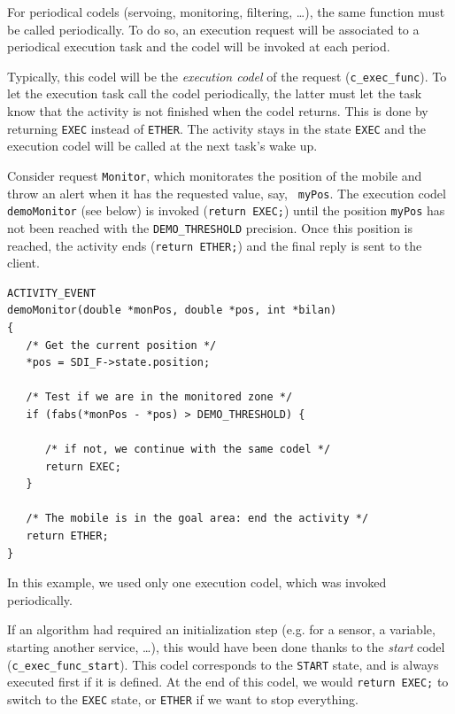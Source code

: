 For periodical codels (servoing, monitoring, filtering, \ldots), the same
function must be called periodically. To do so, an execution request will
be associated  to  a periodical  execution task  and  the  codel will  be
invoked at each period.

Typically, this codel  will be the {\em  execution codel} of the  request
({\tt  c\_exec\_func}).  To let   the    execution task call   the  codel
periodically, the latter must let the task know that  the activity is not
finished  when the codel  returns.  This is done  by returning {\tt EXEC}
instead  of {\tt ETHER}.  The activity stays  in the state {\tt EXEC} and
the execution codel will be called at the next task's wake up.

Consider request {\tt Monitor},   which monitorates the position   of the
mobile and  throw an  alert when it   has the requested value, say,  {\tt
myPos}.  The  execution codel  {\tt  demoMonitor} (see below)  is invoked
({\tt return EXEC;}) until the position {\tt myPos}  has not been reached
with the {\tt DEMO\_THRESHOLD} precision. Once  this position is reached,
the activity ends ({\tt return  ETHER;}) and the  final reply is sent  to
the client.

\begin{center}\begin{cartouche}\small\begin{verbatim}
ACTIVITY_EVENT
demoMonitor(double *monPos, double *pos, int *bilan)
{
   /* Get the current position */
   *pos = SDI_F->state.position;

   /* Test if we are in the monitored zone */
   if (fabs(*monPos - *pos) > DEMO_THRESHOLD) {

      /* if not, we continue with the same codel */
      return EXEC;
   }

   /* The mobile is in the goal area: end the activity */
   return ETHER;
}
\end{verbatim}\end{cartouche}\end{center}

In this example,   we used only  one execution  codel, which  was invoked
periodically.

If an algorithm had required an  initialization step (e.g.  for a sensor,
a variable, starting another service, \ldots), this  would have been done
thanks to the {\em start} codel ({\tt c\_exec\_func\_start}).  This codel
corresponds to the {\tt START} state, and  is always executed first if it
is  defined. At the  end  of this codel,  we  would {\tt return EXEC;} to
switch to  the {\tt  EXEC} state, or   {\tt ETHER} if   we  want to  stop
everything.

